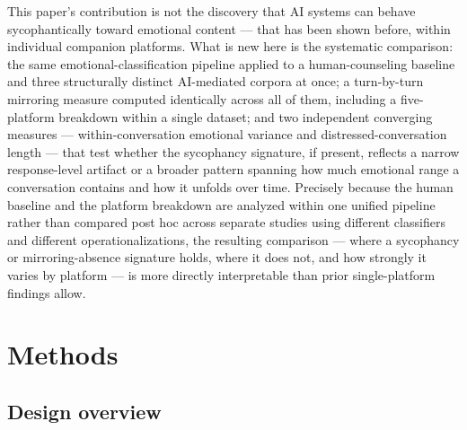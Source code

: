 \documentclass[11pt]{article}
\begin{document}
This paper's contribution is not the discovery that AI systems can behave sycophantically toward emotional content --- that has been shown before, within individual companion platforms. What is new here is the systematic comparison: the same emotional-classification pipeline applied to a human-counseling baseline and three structurally distinct AI-mediated corpora at once; a turn-by-turn mirroring measure computed identically across all of them, including a five-platform breakdown within a single dataset; and two independent converging measures --- within-conversation emotional variance and distressed-conversation length --- that test whether the sycophancy signature, if present, reflects a narrow response-level artifact or a broader pattern spanning how much emotional range a conversation contains and how it unfolds over time. Precisely because the human baseline and the platform breakdown are analyzed within one unified pipeline rather than compared post hoc across separate studies using different classifiers and different operationalizations, the resulting comparison --- where a sycophancy or mirroring-absence signature holds, where it does not, and how strongly it varies by platform --- is more directly interpretable than prior single-platform findings allow.

\section{Methods}

\subsection{Design overview}
\end{document}

